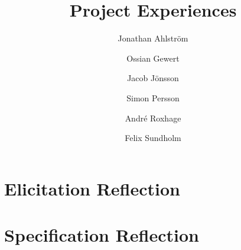 \documentclass[a4paper]{article}
\title{Project Experiences}
\author{Jonathan Ahlström \and Ossian Gewert \and Jacob Jönsson \and Simon Persson \and André Roxhage \and Felix Sundholm}
\begin{document}
\maketitle

\begin{center}
    
\end{center}

\tableofcontents

\newpage


\section{Elicitation Reflection}



\section{Specification Reflection}


\end{document}
